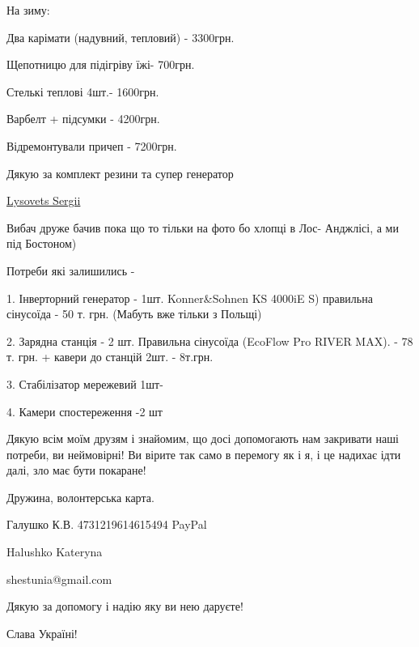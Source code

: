 На зиму:

Два карімати (надувний, тепловий) - 3300грн.

Щепотницю для підігріву їжі- 700грн.

Стелькі теплові 4шт.- 1600грн.

Варбелт + підсумки - 4200грн.

Відремонтували причеп - 7200грн. 

Дякую за комплект резини та супер генератор 

\href{https://www.facebook.com/sergey.lysovets}{Lysovets Sergii}

Вибач друже бачив пока що то тільки на фото бо хлопці в Лос- Анджлісі, а ми під Бостоном)

Потреби які залишились - 

1.  Інверторний генератор - 1шт. Konner\&Sohnen KS 4000iE S) правильна сінусоїда
- 50 т. грн. (Мабуть вже тільки з Польщі)

2.  Зарядна станція -  2 шт. Правильна сінусоїда (EcoFlow Pro RIVER MAX).                         
-  78 т. грн.
+ кавери до станцій 2шт. - 8т.грн. 

3. Стабілізатор мережевий 1шт- 

4. Камери спостереження -2 шт

Дякую всім моїм друзям і знайомим, що досі допомогають нам закривати наші
потреби, ви неймовірні! Ви вірите так само в перемогу як і я, і це надихає ідти
далі, зло має бути покаране! 

Дружина, волонтерська карта.

Галушко К.В.
4731219614615494
 PayPal

Halushko Kateryna

shestunia@gmail.com

Дякую за допомогу і надію яку ви нею даруєте! 

Слава Україні!
